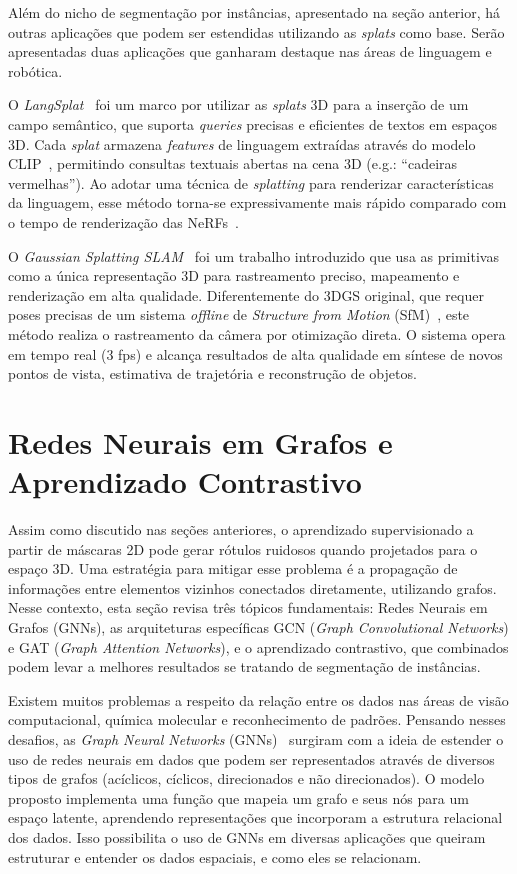 Além do nicho de segmentação por instâncias, apresentado na seção anterior, há outras aplicações que podem ser estendidas utilizando as \emph{splats} como base. Serão apresentadas duas aplicações que ganharam destaque nas áreas de linguagem e robótica.

O \textit{LangSplat}~\cite{Qin_2024_CVPR} foi um marco por utilizar as \emph{splats} 3D para a inserção de um campo semântico, que suporta \textit{queries} precisas e eficientes de textos em espaços 3D. Cada \emph{splat} armazena \textit{features} de linguagem extraídas através do modelo CLIP~\cite{radford2021learning}, permitindo consultas textuais abertas na cena 3D (e.g.: ``cadeiras vermelhas''). Ao adotar uma técnica de \textit{splatting} para renderizar características da linguagem, esse método torna-se expressivamente mais rápido comparado com o tempo de renderização das NeRFs~\cite{mildenhall2021nerf}.

O \textit{Gaussian Splatting SLAM}~\cite{matsuki2024gaussian} foi um trabalho introduzido que usa as primitivas como a única representação 3D para rastreamento preciso, mapeamento e renderização em alta qualidade. Diferentemente do 3DGS original, que requer poses precisas de um sistema \textit{offline} de \textit{Structure from Motion} (SfM)~\cite{Schonberger_2016_CVPR}, este método realiza o rastreamento da câmera por otimização direta. O sistema opera em tempo real (3 fps) e alcança resultados de alta qualidade em síntese de novos pontos de vista, estimativa de trajetória e reconstrução de objetos.

\section{Redes Neurais em Grafos e Aprendizado Contrastivo}
\label{sec:rev_gnn_contrastivo}

Assim como discutido nas seções anteriores, o aprendizado supervisionado a partir de máscaras 2D pode gerar rótulos ruidosos quando projetados para o espaço 3D. Uma estratégia para mitigar esse problema é a propagação de informações entre elementos vizinhos conectados diretamente, utilizando grafos. Nesse contexto, esta seção revisa três tópicos fundamentais: Redes Neurais em Grafos (GNNs), as arquiteturas específicas GCN (\textit{Graph Convolutional Networks}) e GAT (\textit{Graph Attention Networks}), e o aprendizado contrastivo, que combinados podem levar a melhores resultados se tratando de segmentação de instâncias.

Existem muitos problemas a respeito da relação entre os dados nas áreas de visão computacional, química molecular e reconhecimento de padrões. Pensando nesses desafios, as \textit{Graph Neural Networks} (GNNs)~\cite{scarselli2008graph} surgiram com a ideia de estender o uso de redes neurais em dados que podem ser representados através de diversos tipos de grafos (acíclicos, cíclicos, direcionados e não direcionados). O modelo proposto implementa uma função que mapeia um grafo e seus nós para um espaço latente, aprendendo representações que incorporam a estrutura relacional dos dados. Isso possibilita o uso de GNNs em diversas aplicações que queiram estruturar e entender os dados espaciais, e como eles se relacionam.

